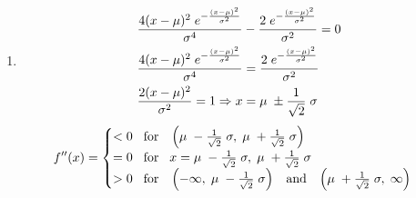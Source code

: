 \documentclass[12pt]{amsart}
\begin{document}
\begin{enumerate}
\begin{enumerate}
			\item 
				\begin{align}
					& \frac{4(x-\mu)^2 \hspace{0.1cm} e^{-\frac{(x-\mu)^2}{\sigma^2}}}{\sigma^4} - 
					\frac{2 \hspace{0.1cm} e^{-\frac{(x-\mu)^2}{\sigma^2}}}{\sigma^2}=0 \notag \\
					& \frac{4(x-\mu)^2 \hspace{0.1cm} e^{-\frac{(x-\mu)^2}{\sigma^2}}}{\sigma^4} =
					\frac{2 \hspace{0.1cm} e^{-\frac{(x-\mu)^2}{\sigma^2}}}{\sigma^2} \notag \\
					& \frac{2(x-\mu)^2}{\sigma^2}=1 \Rightarrow x = \mu \hspace{0.1cm} \pm 
					\frac{1}{\sqrt{2}} \hspace{0.1cm} \sigma \notag
				\end{align}
				\begin{align}
					f''(x)=
					\begin{cases}
						< 0 \hspace{0.3cm} \text{for} \hspace{0.3cm} \left(\mu \hspace{0.1cm} - 
						\frac{1}{\sqrt{2}} \hspace{0.1cm} \sigma, \hspace{0.1cm} \mu \hspace{0.1cm} + 
						\frac{1}{\sqrt{2}} \hspace{0.1cm} \sigma \right) \notag \\
						= 0 \hspace{0.3cm} \text{for} \hspace{0.3cm} x=\mu \hspace{0.1cm} - 
						\frac{1}{\sqrt{2}} \hspace{0.1cm} \sigma, \hspace{0.1cm} \mu \hspace{0.1cm} + 
						\frac{1}{\sqrt{2}} \hspace{0.1cm} \sigma \notag \\
						> 0 \hspace{0.3cm} \text{for} \hspace{0.3cm}\left(-\infty,\hspace{0.1cm} \mu 							\hspace{0.1cm} - \frac{1}{\sqrt{2}} \hspace{0.1cm} \sigma\right) \hspace{0.3cm} 						\text{and} 	\hspace{0.3cm} \left(\mu \hspace{0.1cm} + \frac{1}{\sqrt{2}} 
						\hspace{0.1cm} \sigma,\hspace{0.1cm} \infty\right) \notag
					\end{cases}
				\end{align}
				

\end{enumerate}
\end{enumerate}
\end{document}

